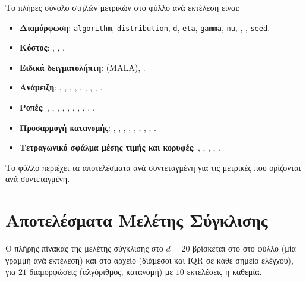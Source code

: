Το πλήρες σύνολο στηλών μετρικών στο φύλλο ανά εκτέλεση είναι:

\begin{itemize}
\item \textbf{Διαμόρφωση}: \texttt{algorithm}, \texttt{distribution},
      \texttt{d}, \texttt{eta}, \texttt{gamma}, \texttt{nu},
      , , \texttt{seed}.
\item \textbf{Κόστος}: , ,
      .
\item \textbf{Ειδικά δειγματολήπτη}:  (MALA),
      .
\item \textbf{Ανάμειξη}: , ,
      , , ,
      , , ,
      .
\item \textbf{Ροπές}: ,
      , ,
      , ,
      , ,
      ,
      ,
      .
\item \textbf{Προσαρμογή κατανομής}: ,
      , ,
      , ,
      , ,
      , .
\item \textbf{Τετραγωνικό σφάλμα μέσης τιμής και κορυφές}: ,
      , ,
      , .
\end{itemize}

Το φύλλο  περιέχει τα αποτελέσματα ανά συντεταγμένη για τις
μετρικές που ορίζονται ανά συντεταγμένη.

\section{Αποτελέσματα Μελέτης Σύγκλισης}
\label{sec:app-convergence-table}

Ο πλήρης πίνακας της μελέτης σύγκλισης στο $d=20$ βρίσκεται στο
στο φύλλο  (μία γραμμή ανά εκτέλεση) και στο αρχείο
 (διάμεσοι και IQR σε κάθε σημείο ελέγχου), για $21$ διαμορφώσεις
(αλγόριθμος, κατανομή) με $10$ εκτελέσεις η καθεμία.
